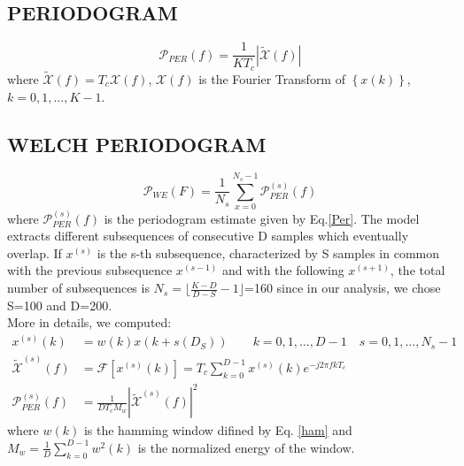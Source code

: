 \documentclass[a4paper,11pt,openright,twoside]{report}
\begin{document}
\subsection*{PERIODOGRAM}
\begin{equation}\label{Per}
\mathcal{P}_{PER}(f) = \frac{1}{KT_c} | \tilde{\mathcal{X}}(f) |
\end{equation}
where $\tilde{\mathcal{X}}(f) = T_c \mathcal{X}(f)$, $\mathcal{X}(f)$ is the Fourier Transform of $ \left\lbrace x(k) \right\rbrace$, $k = 0,1,...,K-1$.

\subsection*{WELCH PERIODOGRAM}
\begin{equation}
\mathcal{P}_{WE}(F) = \frac{1}{N_s}\sum_{x=0}^{N_s-1}\mathcal{P}_{PER}^{(s)}(f)
\end{equation}
where $\mathcal{P}_{PER}^{(s)}(f)$ is the periodogram estimate given by Eq.\ref{Per}.  
The model extracts different subsequences of consecutive D samples which eventually overlap. If $x^{(s)}$ is the s-th subsequence, characterized by S samples in common with the previous subsequence $x^{(s-1)}$ and with the following $x^{(s+1)}$, the total number of subsequences is $N_s = \lfloor \frac{K-D}{D-S}-1 \rfloor$=160 since in our analysis, we chose S=100 and D=200. \\
More in details, we computed:
\begin{equation*}
\begin{split}
x^{(s)}(k) &= w(k)x(k+s(D_S))   \quad \quad k=0,1,...,D-1 \quad s = 0,1,...,N_s-1 \\
\tilde{\mathcal{X}}^{(s)}(f) &= \mathcal{F}[x^{(s)}(k)] = T_c\sum_{k=0}^{D-1}x^{(s)}(k)e^{-j2 \pi fkT_c} \\
\mathcal{P}^{(s)}_{PER}(f) &= \frac{1}{DT_cM_w} \left | \tilde{\mathcal{X}}^{(s)}(f) \right |^2
\end{split}
\end{equation*}
where $w(k)$ is the hamming window difined by Eq. \ref{ham} and $M_w = \frac{1}{D}\sum_{k=0}^{D-1}w^2(k)$ is the normalized energy of the window.
\end{document}
